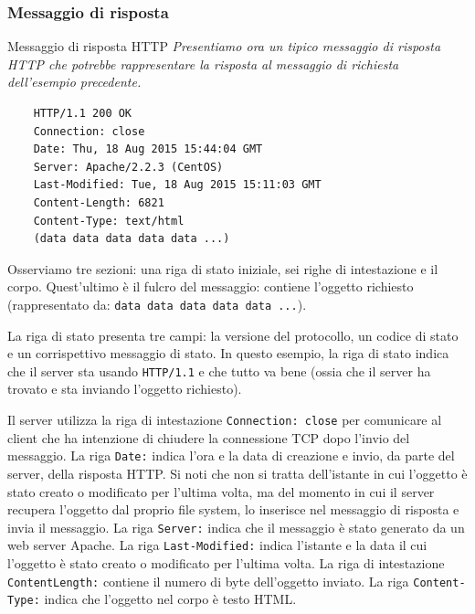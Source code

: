 \subsubsection{Messaggio di risposta}
\begin{Example}{Messaggio di risposta HTTP}{}
    \textit{Presentiamo ora un tipico messaggio di risposta HTTP che potrebbe rappresentare la risposta al messaggio di richiesta dell'esempio precedente.}
    \begin{lstlisting}
    HTTP/1.1 200 OK
    Connection: close
    Date: Thu, 18 Aug 2015 15:44:04 GMT
    Server: Apache/2.2.3 (CentOS)
    Last-Modified: Tue, 18 Aug 2015 15:11:03 GMT
    Content-Length: 6821
    Content-Type: text/html
    (data data data data data ...)
    \end{lstlisting}
    Osserviamo tre sezioni: una riga di stato iniziale, sei righe di intestazione e il corpo. Quest'ultimo è il fulcro del messaggio: contiene l'oggetto richiesto (rappresentato da: \verb|data data data data data ...|). 
    
    La riga di stato presenta tre campi: la versione del protocollo, un codice di stato e un corrispettivo messaggio di stato. In questo esempio, la riga di stato indica che il server sta usando \verb|HTTP/1.1| e che tutto va bene (ossia che il server ha trovato e sta inviando l'oggetto richiesto).
    
    Il server utilizza la riga di intestazione \verb|Connection: close| per comunicare al client che ha intenzione di chiudere la connessione TCP dopo l'invio del messaggio. La riga \verb|Date:| indica l'ora e la data di creazione e invio, da parte del server, della risposta HTTP. Si noti che non si tratta dell'istante in cui l'oggetto è stato creato o modificato per l'ultima volta, ma del momento in cui il server recupera l'oggetto dal proprio file system, lo inserisce nel messaggio di risposta e invia il messaggio. La riga \verb|Server:| indica che il messaggio è stato generato da un web server Apache. La riga \verb|Last-Modified:| indica l'istante e la data il cui l'oggetto è stato creato o modificato per l'ultima volta. La riga di intestazione \verb|ContentLength:| contiene il numero di byte dell'oggetto inviato. La riga \verb|Content-Type:| indica che l'oggetto nel corpo è testo HTML.
\end{Example}

